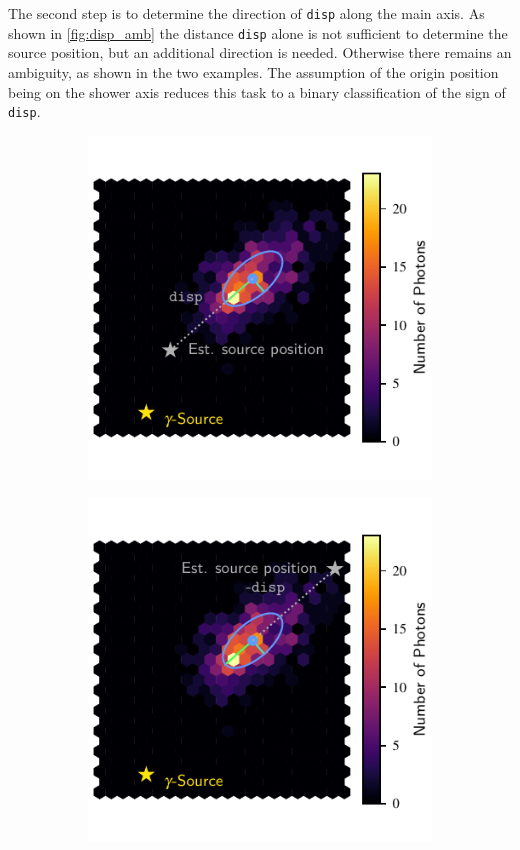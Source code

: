 The second step is to determine the direction of \texttt{disp} along
the main axis. As shown in \autoref{fig:disp_amb} the distance \texttt{disp} alone is
not sufficient to determine the source position, but an additional direction is
needed. Otherwise there remains an ambiguity, as shown in the two examples.
The assumption of the origin position being on the shower axis reduces this
task to a binary classification of the sign of \texttt{disp}.
%
\begin{figure}
  \begin{subfigure}{0.5\textwidth}
    \includegraphics[width=\textwidth]{Plots/hillas_4.pdf}
  \end{subfigure}
  \begin{subfigure}{0.5\textwidth}
    \includegraphics[width=\textwidth]{Plots/hillas_5.pdf}

\end{subfigure}
\end{figure}
